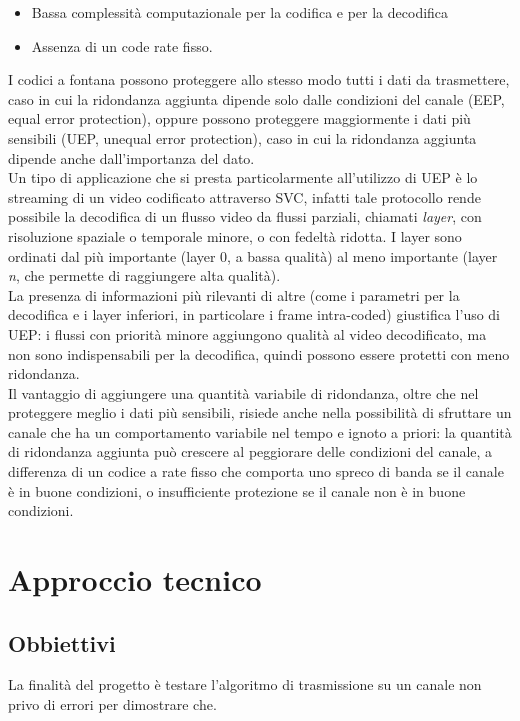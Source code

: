 \documentclass[italian, a4paper, 12pt]{article}
\begin{document}
\begin{itemize}
\item Bassa complessità computazionale per la codifica e per la decodifica
\item Assenza di un code rate fisso.
\end{itemize}
I codici a fontana possono proteggere allo stesso modo tutti i dati da trasmettere, caso in cui la ridondanza aggiunta dipende solo dalle condizioni del canale (EEP, equal error protection), oppure possono proteggere maggiormente i dati più sensibili (UEP, unequal error protection), caso in cui la ridondanza aggiunta dipende anche dall'importanza del dato.\\
Un tipo di applicazione che si presta particolarmente all'utilizzo di UEP \cite{uep} è lo streaming di un video codificato attraverso SVC, infatti tale protocollo rende possibile la decodifica di un flusso video da flussi parziali, chiamati \textit{layer}, con risoluzione spaziale o temporale minore, o con fedeltà ridotta. I layer sono ordinati dal più importante (layer 0, a bassa qualità) al meno importante (layer \textit{n}, che permette di raggiungere alta qualità).\\
La presenza di informazioni più rilevanti di altre (come i parametri per la decodifica e i layer inferiori, in particolare i frame intra-coded) giustifica l'uso di UEP: i flussi con priorità minore aggiungono qualità al video decodificato, ma non sono indispensabili per la decodifica, quindi possono essere protetti con meno ridondanza.\\
Il vantaggio di aggiungere una quantità variabile di ridondanza, oltre che nel proteggere meglio i dati più sensibili, risiede anche nella possibilità di sfruttare un canale che ha un comportamento variabile nel tempo e ignoto a priori: la quantità di ridondanza aggiunta può crescere al peggiorare delle condizioni del canale, a differenza di un codice a rate fisso che comporta uno spreco di banda se il canale è in buone condizioni, o insufficiente protezione se il canale non è in buone condizioni.

\section{Approccio tecnico}
\subsection{Obbiettivi} %
La finalità del progetto è testare l'algoritmo di trasmissione su un canale non privo di errori per dimostrare che.
\end{document}
